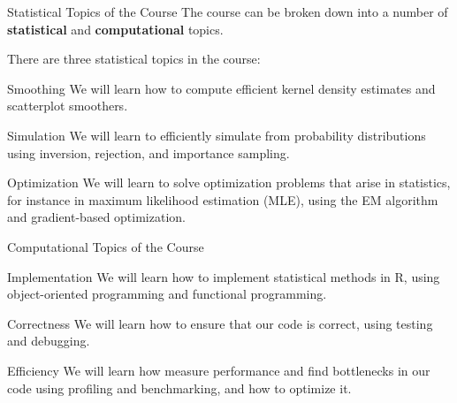 \documentclass[
  ignorenonframetext,
  aspectratio=1610,
  onlytextwidth]{beamer}
\begin{document}
\begin{frame}{Statistical Topics of the Course}
\label{statistical-topics-of-the-course}
The course can be broken down into a number of \textbf{statistical} and
\textbf{computational} topics.

\pause

There are three statistical topics in the course:

\pause

\begin{block}{Smoothing}
\label{smoothing}
We will learn how to compute efficient kernel density estimates and
scatterplot smoothers.

\pause
\end{block}

\begin{block}{Simulation}
\label{simulation}
We will learn to efficiently simulate from probability distributions
using inversion, rejection, and importance sampling.

\pause
\end{block}

\begin{block}{Optimization}
\label{optimization}
We will learn to solve optimization problems that arise in statistics,
for instance in maximum likelihood estimation (MLE), using the EM
algorithm and gradient-based optimization.
\end{block}
\end{frame}

\begin{frame}{Computational Topics of the Course}
\label{computational-topics-of-the-course}
\begin{block}{Implementation}
\label{implementation}
We will learn how to implement statistical methods in R, using
object-oriented programming and functional programming.

\pause
\end{block}

\begin{block}{Correctness}
\label{correctness}
We will learn how to ensure that our code is correct, using testing and
debugging.

\pause
\end{block}

\begin{block}{Efficiency}
\label{efficiency}
We will learn how measure performance and find bottlenecks in our code
using profiling and benchmarking, and how to optimize it.
\end{block}
\end{frame}
\end{document}
